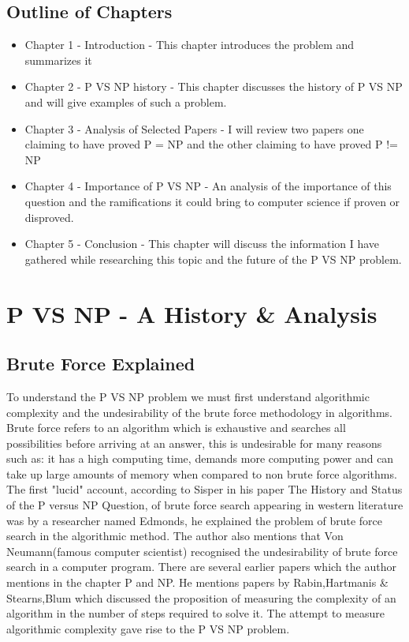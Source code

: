 \documentclass{report}
\begin{document}
\section{Outline of Chapters}
\begin{itemize}
  \item Chapter 1 - Introduction - This chapter introduces the problem and summarizes it
  \item  Chapter 2 - P VS NP history - This chapter discusses the history of P VS NP and will give examples of such a problem.
  \item Chapter 3 - Analysis of Selected Papers - I will review two papers one claiming to have proved P = NP and the other claiming to have proved P != NP
  \item Chapter 4 - Importance of P VS NP - An analysis of the importance of this question and the ramifications it could bring to computer science if proven or disproved.
  \item Chapter 5 - Conclusion - This chapter will discuss the information I have gathered while researching this topic and the future of the P VS NP problem.
\end{itemize}
\chapter{P VS NP - A History \& Analysis}
\section{Brute Force Explained}
To understand the P VS NP problem we must first understand algorithmic complexity and the undesirability of the brute force methodology in algorithms.
Brute force refers to an algorithm which is exhaustive and searches all possibilities before arriving at an answer, this is undesirable for many reasons such as: it has a high computing time, demands more computing power and can take up large amounts of memory when compared to non brute force algorithms.  The first "lucid" account, according to Sisper in his paper The History and Status of the P versus NP Question, of brute force search appearing in western literature was by a researcher named Edmonds\cite{HistoryOfPVsNP}, he explained the problem of brute force search in the algorithmic method.  The author also mentions that Von Neumann(famous computer scientist\cite{Neumann}) recognised the undesirability of brute force search in a computer program. There are several earlier papers which the author mentions in the chapter P and NP. He mentions papers by Rabin\cite{ResearchPaperRabin},Hartmanis \& Stearns\cite{ResearchPaperHartmanis},Blum\cite{ResearchPaperBlum} which discussed the proposition of measuring the complexity of an algorithm in the number of steps required to solve it. The attempt to measure algorithmic complexity gave rise to the P VS NP problem.
\end{document}

